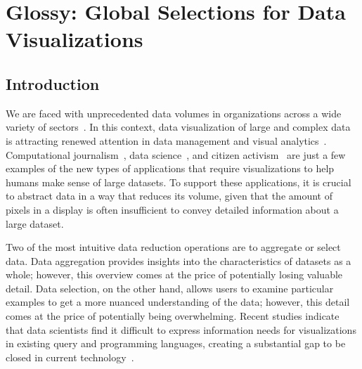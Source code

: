 \documentclass[11pt, oneside]{report}
\begin{document}


\chapter{Glossy: Global Selections for Data Visualizations}
\label{chapter:glossy}
\lstset{
  language=sql
}


\section{Introduction}
\label{sec:glossy:introduction}

We are faced with unprecedented data volumes in organizations across a wide variety of sectors~\cite{MCB+11:McKinsey}. In this context, data visualization of large and complex data is attracting renewed attention in data management and visual analytics~\cite{FeketeS12:DMVisChallenges,hanrahan:enthusiast,wu:case}. Computational journalism~\cite{CohenHT:2011:CompJournalism}, data science~\cite{KandelPHH12:InterviewStudy}, and citizen activism~\cite{ViegasM:2009:ManyEyes} are just a few examples of the new types of applications that require visualizations to help humans make sense of large datasets. To support these applications, it is crucial to abstract data in a way that reduces its volume, given that the amount of pixels in a display is often insufficient to convey detailed information about a large dataset.

Two of the most intuitive data reduction operations are to aggregate or select data. Data aggregation provides insights into the characteristics of datasets as a whole; however, this overview comes at the price of potentially losing valuable detail. Data selection, on the other hand, allows users to examine particular examples to get a more nuanced understanding of the data; however, this detail comes at the price of potentially being overwhelming. Recent studies indicate that data scientists find it difficult to express information needs for visualizations in existing query and programming languages, creating a substantial gap to be closed in current technology~\cite{KandelPHH12:InterviewStudy}.
 
\end{document}
